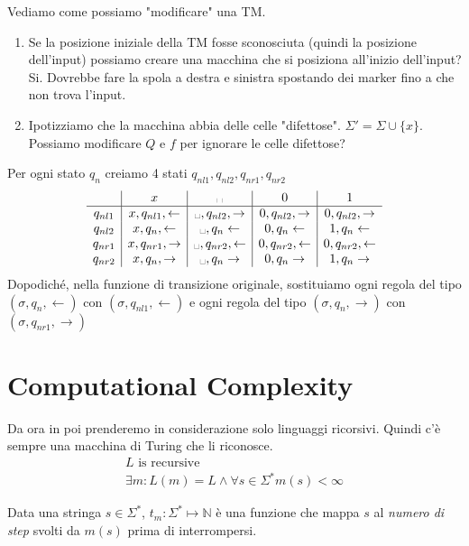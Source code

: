 \documentclass{article}
\newcommand{\tvs}[0]{\text{\textvisiblespace}}
\begin{document}
Vediamo come possiamo "modificare" una TM.
\begin{enumerate}
    \item Se la posizione iniziale della TM fosse sconosciuta (quindi la posizione dell'input) possiamo creare una macchina che si posiziona all'inizio dell'input? Si. Dovrebbe fare la spola a destra e sinistra spostando dei marker fino a che non trova l'input.
    \item Ipotizziamo che la macchina abbia delle celle "difettose". $\Sigma' = \Sigma\cup\{x\}$. Possiamo modificare $Q$ e $f$ per ignorare le celle difettose?
\end{enumerate}

Per ogni stato $q_n$ creiamo 4 stati $q_{nl1},q_{nl2}, q_{nr1},q_{nr2}$
\begin{align*}
    \begin{array}{c|c|c|c|c}
                    & x & \tvs & 0 & 1 \\
        \hline
        q_{nl1} & x,q_{nl1},\leftarrow & \tvs,q_{nl2},\rightarrow & 0,q_{nl2},\rightarrow & 0,q_{nl2},\rightarrow \\
        q_{nl2} & x,q_n,\leftarrow & \tvs,q_n\leftarrow & 0,q_n\leftarrow & 1,q_n\leftarrow \\
        q_{nr1} & x,q_{nr1},\rightarrow & \tvs,q_{nr2},\leftarrow & 0,q_{nr2},\leftarrow & 0,q_{nr2},\leftarrow \\
        q_{nr2} & x,q_n,\rightarrow & \tvs,q_n\rightarrow & 0,q_n\rightarrow & 1,q_n\rightarrow \\
    \end{array}
\end{align*}
Dopodiché, nella funzione di transizione originale, sostituiamo ogni regola del tipo $(\sigma,q_n,\leftarrow)$ con $(\sigma,q_{nl1},\leftarrow)$ e ogni regola del tipo $(\sigma,q_n,\rightarrow)$ con $(\sigma,q_{nr1},\rightarrow)$

\section{Computational Complexity}
Da ora in poi prenderemo in considerazione solo linguaggi ricorsivi. Quindi c'è sempre una macchina di Turing che li riconosce.
\begin{gather*}
    L \text{ is recursive } \\
    \exists m: L(m)=L \wedge \forall s\in \Sigma^* m(s)<\infty
\end{gather*}

Data una stringa $s\in\Sigma^*$, $t_m:\Sigma^*\mapsto\mathbb{N}$ è una funzione che mappa $s$ al \textit{numero di step} svolti da $m(s)$ prima di interrompersi.
\end{document}
